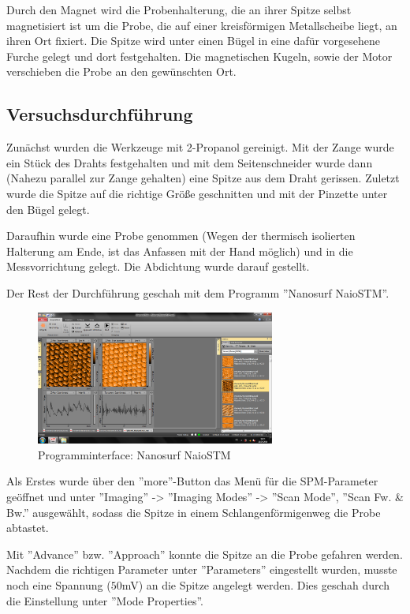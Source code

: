 \noindent Durch den Magnet wird die Probenhalterung, die an ihrer Spitze selbst magnetisiert ist um die Probe, die auf einer kreisförmigen Metallscheibe liegt, an ihren Ort fixiert. Die Spitze wird unter einen Bügel in eine dafür vorgesehene Furche gelegt und dort festgehalten. Die magnetischen Kugeln, sowie der Motor verschieben die Probe an den gewünschten Ort.

\subsection{Versuchsdurchführung}
Zunächst wurden die Werkzeuge mit 2-Propanol gereinigt. Mit der Zange wurde ein Stück des Drahts festgehalten und mit dem Seitenschneider wurde dann (Nahezu parallel zur Zange gehalten) eine Spitze aus dem Draht gerissen. Zuletzt wurde die Spitze auf die richtige Größe geschnitten und mit der Pinzette unter den Bügel gelegt.

\noindent Daraufhin wurde eine Probe genommen (Wegen der thermisch isolierten Halterung am Ende, ist das Anfassen mit der Hand möglich) und in die Messvorrichtung gelegt. Die Abdichtung wurde darauf gestellt.

\noindent Der Rest der Durchführung geschah mit dem Programm ''Nanosurf NaioSTM''.

\begin{figure}
	\centering
		\includegraphics[width=0.7\textwidth]{hopg1.png}
	\caption{Programminterface: Nanosurf NaioSTM}
	\label{fig:Programm}
\end{figure}

\noindent Als Erstes wurde über den ''more''-Button das Menü für die SPM-Parameter geöffnet und unter ''Imaging'' -> ''Imaging Modes'' -> ''Scan Mode'', ''Scan Fw. \& Bw.'' ausgewählt, sodass die Spitze in einem Schlangenförmigenweg die Probe abtastet.

\noindent Mit ''Advance'' bzw. ''Approach'' konnte die Spitze an die Probe gefahren werden. Nachdem die richtigen Parameter unter ''Parameters'' eingestellt wurden, musste noch eine Spannung (\(50\)mV) an die Spitze angelegt werden. Dies geschah durch die Einstellung unter ''Mode Properties''.